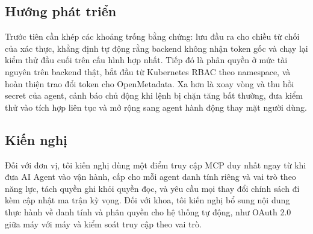 \subsection{Hướng phát triển}

Trước tiên cần khép các khoảng trống bằng chứng: lưu đầu ra cho chiều từ chối của xác thực, khẳng định tự động rằng backend không nhận token gốc và chạy lại kiểm thử đầu cuối trên cấu hình hợp nhất. Tiếp đó là phân quyền ở mức tài nguyên trên backend thật, bắt đầu từ Kubernetes RBAC theo namespace, và hoàn thiện trao đổi token cho OpenMetadata. Xa hơn là xoay vòng và thu hồi secret của agent, cảnh báo chủ động khi lệnh bị chặn tăng bất thường, đưa kiểm thử vào tích hợp liên tục và mở rộng sang agent hành động thay mặt người dùng.

\subsection{Kiến nghị}

Đối với đơn vị, tôi kiến nghị dùng một điểm truy cập MCP duy nhất ngay từ khi đưa AI Agent vào vận hành, cấp cho mỗi agent danh tính riêng và vai trò theo năng lực, tách quyền ghi khỏi quyền đọc, và yêu cầu mọi thay đổi chính sách đi kèm cập nhật ma trận kỳ vọng. Đối với khoa, tôi kiến nghị bổ sung nội dung thực hành về danh tính và phân quyền cho hệ thống tự động, như OAuth 2.0 giữa máy với máy và kiểm soát truy cập theo vai trò.

